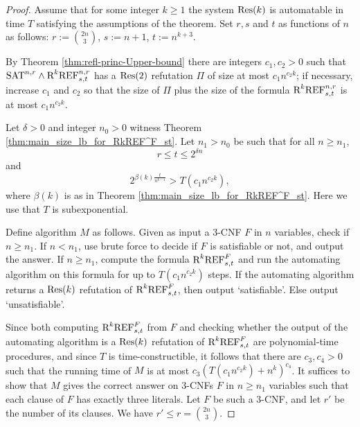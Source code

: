 \begin{proof}
Assume that for some integer $k \geq 1$ the system $\textnormal{Res}(k)$ is automatable in time $T$ satisfying the assumptions of the theorem. Set $r, s$ and $t$ as functions of $n$ as follows: $r := \binom{2n}{3}$, $s := n+1$, $t := n^{k+3}$. 

By Theorem \ref{thm:refl-princ-Upper-bound} there are integers $c_1, c_2 > 0$ such that $\textnormal{SAT}^{n,r} \land \textnormal{R}^k\textnormal{REF}^{n,r}_{s,t}$ has a $\textnormal{Res}(2)$ refutation $\Pi$ of size at most $c_1 n^{c_2 k}$; if necessary, increase $c_1$ and $c_2$ so that the size of $\Pi$ plus the size of the formula $\textnormal{R}^k\textnormal{REF}^{n,r}_{s,t}$ is at most $c_1 n^{c_2 k}$. 

Let $\delta > 0$ and integer $n_0 > 0$ witness Theorem \ref{thm:main_size_lb_for_RkREF^F_st}.  
Let $n_1 > n_0$ be such that for all $n \geq n_1$,
\begin{equation}
\label{eqn:cond_on_t_in_proof_of_non-automatability}
r \leq t \leq 2^{\delta n} 
\end{equation}
and 
\begin{equation}
\label{eqn:l.b._on_refutations_greater_than_runtime_of_automating}
2^{\beta(k)\frac{t}{n^{k-1}}} > T(c_1 n^{c_2 k}),
\end{equation}
where $\beta(k)$ is as in Theorem \ref{thm:main_size_lb_for_RkREF^F_st}. Here we use that $T$ is subexponential.

Define algorithm $M$ as follows. Given as input a 3-CNF $F$ in $n$ variables, check if $n \geq n_1$. If $n < n_1$, use brute force to decide if $F$ is satisfiable or not, and output the answer. If $n \geq n_1$, compute the formula $\textnormal{R}^k\textnormal{REF}^{F}_{s,t}$ and run the automating algorithm on this formula for up to $T(c_1 n^{c_2 k})$ steps. If the automating algorithm returns a $\textnormal{Res}(k)$ refutation of $\textnormal{R}^k\textnormal{REF}^{F}_{s,t}$, then output `satisfiable'. Else output `unsatisfiable'. 

Since both computing $\textnormal{R}^k\textnormal{REF}^{F}_{s,t}$ from $F$ and checking whether the output of the automating algorithm is a $\textnormal{Res}(k)$ refutation of $\textnormal{R}^k\textnormal{REF}^{F}_{s,t}$ are polynomial-time procedures, and since $T$ is time-constructible, it follows that there are $c_3, c_4 > 0$ such that the running time of $M$ is at most $c_3 (T(c_1 n^{c_2 k}) + n^{k})^{c_4}$. 
It suffices to show that $M$ gives the correct answer on 3-CNFs $F$ in $n \geq n_1$ variables such that each clause of $F$ has exactly three literals. Let $F$ be such a 3-CNF, and let $r'$ be the number of its clauses. We have $r' \leq r = \binom{2n}{3}$.


\end{proof}
